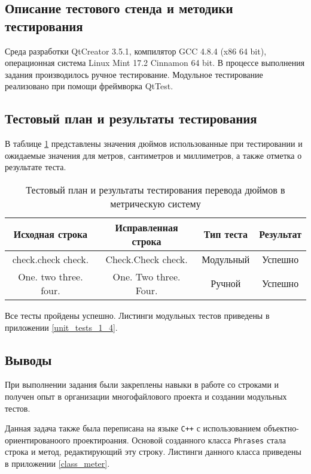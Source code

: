 \documentclass[12pt,a4paper]{report}
\begin{document}
\subsection{Описание тестового стенда и методики тестирования}
\hspace{\parindent}Среда разработки QtCreator 3.5.1, компилятор GCC 4.8.4 (x86 64 bit), операционная система Linux Mint 17.2 Cinnamon 64 bit.
В процессе выполнения задания производилось ручное тестирование.
Модульное тестирование реализовано при помощи фреймворка QtTest.

\subsection{Тестовый план и результаты тестирования}
\hspace{\parindent}В таблице \ref{inch_to_cm_test_plan} представлены значения дюймов использованные при тестировании и ожидаемые значения для метров, сантиметров и миллиметров, а также отметка о результате теста.
\FloatBarrier
\begin{table}[h]
\caption{Тестовый план и результаты тестирования перевода дюймов в метрическую систему}
\label{inch_to_cm_test_plan}
\begin{tabular}{| c | c | c | c |}
\hline 
Исходная строка & Исправленная строка & Тип теста & Результат\\ 
\hline 
check.check check.& Check.Check check. & Модульный & Успешно \\ 
\hline 
One. two three. four. & One. Two three. Four. & Ручной & Успешно \\ 
\hline 
\end{tabular} 
\end{table}
\FloatBarrier
Все тесты пройдены успешно. Листинги модульных тестов приведены в приложении \ref{unit_tests_1_4}.
\subsection{Выводы}
\hspace{\parindent}При выполнении задания были закреплены навыки в работе со строками и получен опыт в организации многофайлового проекта и создании модульных тестов.

Данная задача также была переписана на языке \verb|C++| с использованием объектно-ориентированоого проектироания. Основой созданного класса \verb+Phrases+ стала строка и метод, редактирующий эту строку. Листинги данного класса приведены в приложении \ref{class_meter}.
\end{document}
